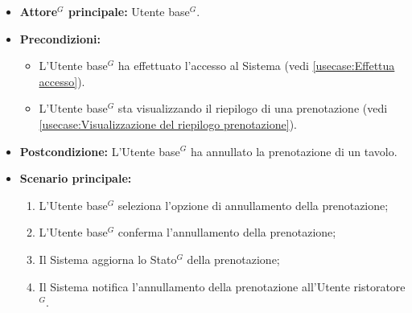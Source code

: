 \label{usecase:Annullamento della prenotazione}
\begin{itemize}
	\item \textbf{\gls{Attore}$^G$ principale:} \gls{Utente base}$^G$.

	\item \textbf{Precondizioni:}
	      \begin{itemize}
		      \item L'\gls{Utente base}$^G$ ha effettuato l'accesso al Sistema (vedi \autoref{usecase:Effettua accesso}).
		      \item L'\gls{Utente base}$^G$ sta visualizzando il riepilogo di una prenotazione (vedi \autoref{usecase:Visualizzazione del riepilogo prenotazione}).
	      \end{itemize}

	\item \textbf{Postcondizione:}
	      L'\gls{Utente base}$^G$ ha annullato la prenotazione di un tavolo.

	\item \textbf{Scenario principale:}
	      \begin{enumerate}
		      \item L'\gls{Utente base}$^G$ seleziona l'opzione di annullamento
		            della prenotazione;

		      \item L'\gls{Utente base}$^G$ conferma l'annullamento della prenotazione;

		      \item Il Sistema aggiorna lo \gls{Stato}$^G$ della prenotazione;

		      \item Il Sistema notifica l'annullamento della prenotazione
		            all'\gls{Utente ristoratore}$^G$.
	      \end{enumerate}
\end{itemize}
